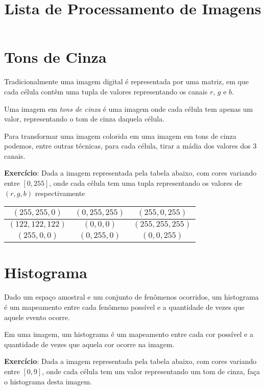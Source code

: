 \documentclass[12pt]{article}
\title{Lista de Processamento de Imagens}
\date{}
\begin{document}
\maketitle


\vspace{3em}

\section{Tons de Cinza}

Tradicionalmente uma imagem digital é representada por uma matriz, em que cada célula contêm uma tupla de valores representando os canais $r$, $g$ e $b$.

Uma imagem em \textit{tons de cinza} é uma imagem onde cada célula tem apenas um valor, representando o tom de cinza daquela célula.

Para transformar uma imagem colorida em uma imagem em tons de cinza podemos, entre outras técnicas, para cada célula, tirar a mádia dos valores dos 3 canais.


\textbf{Exercício}: Dada a imagem representada pela tabela abaixo, com cores variando entre $[0, 255]$, onde cada célula tem uma tupla representando os valores de $(r, g, b)$ respectivamente

\begin{tabular}{|c|c|c|}
\hline
$(255, 255,   0)$ & $(  0, 255, 255)$ & $(255,   0, 255)$ \\ \hline
$(122, 122, 122)$ & $(  0,   0,   0)$ & $(255, 255, 255)$ \\ \hline
$(255,   0,   0)$ & $(  0, 255,   0)$ & $(  0,   0, 255)$ \\ \hline

\end{tabular}



\break



\section{Histograma}

Dado um espaço amostral e um conjunto de fenômenos ocorridos, um histograma é um mapeamento entre cada fenômeno possível e a quantidade de vezes que aquele evento ocorre.

Em uma imagem, um histograma é um mapeamento entre cada cor possível e a quantidade de vezes que aquela cor ocorre na imagem.

\textbf{Exercício}: Dada a imagem representada pela tabela abaixo, com cores variando entre $[0, 9]$, onde cada célula tem um valor representando um tom de cinza, faça o histograma desta imagem.
\end{document}
